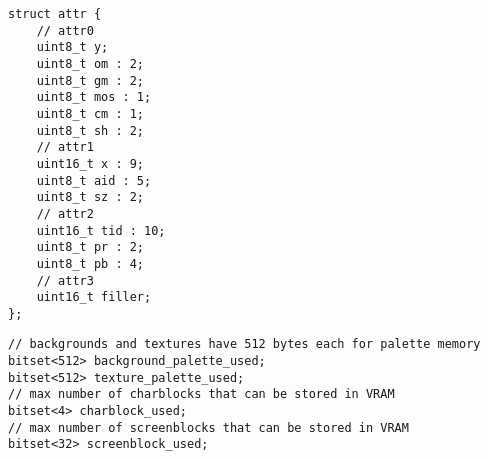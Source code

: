 \begin{lstlisting}[float,caption={\textit{Struct} com \textit{bitfields} para atributos das texturas.}]
struct attr {
    // attr0
    uint8_t y;
    uint8_t om : 2;
    uint8_t gm : 2;
    uint8_t mos : 1;
    uint8_t cm : 1;
    uint8_t sh : 2;
    // attr1
    uint16_t x : 9;
    uint8_t aid : 5;
    uint8_t sz : 2;
    // attr2
    uint16_t tid : 10;
    uint8_t pr : 2;
    uint8_t pb : 4;
    // attr3
    uint16_t filler;
};
\end{lstlisting}

\begin{lstlisting}[float,caption={\textit{Bitsets} para checagem de disponibilidade na memória.}]
// backgrounds and textures have 512 bytes each for palette memory
bitset<512> background_palette_used;
bitset<512> texture_palette_used;
// max number of charblocks that can be stored in VRAM
bitset<4> charblock_used;
// max number of screenblocks that can be stored in VRAM
bitset<32> screenblock_used;
\end{lstlisting}
